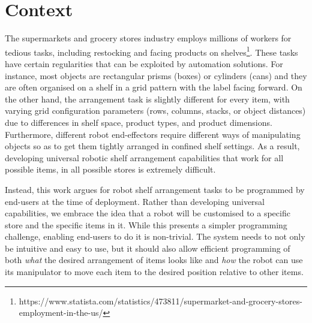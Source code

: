 \section{Context}\label{sec:irosintro}
The supermarkets and grocery stores industry employs millions of workers for tedious tasks, including restocking and facing products on shelves\footnote{https://www.statista.com/statistics/473811/supermarket-and-grocery-stores-employment-in-the-us/}.
These tasks have certain regularities that can be exploited by automation solutions.
For instance, most objects are rectangular prisms (boxes) or cylinders (cans) and they are often organised on a shelf in a grid pattern with the label facing forward.
On the other hand, the arrangement task is slightly different for every item, with varying grid configuration parameters (rows, columns, stacks, or object distances) due to differences in shelf space, product types, and product dimensions.
Furthermore, different robot end-effectors require different ways of manipulating objects so as to get them tightly arranged in confined shelf settings.
As a result, developing universal robotic shelf arrangement capabilities that work for all possible items, in all possible stores is extremely difficult.

Instead, this work argues for robot shelf arrangement tasks to be programmed by end-users at the time of deployment.
Rather than developing universal capabilities, we embrace the idea that a robot will be customised to a specific store and the specific items in it.
While this presents a simpler programming challenge, enabling end-users to do it is non-trivial.
The system needs to not only be intuitive and easy to use, but it should also allow efficient programming of both {\em what} the desired arrangement of items looks like and {\em how} the robot can use its manipulator to move each item to the desired position relative to other items.


